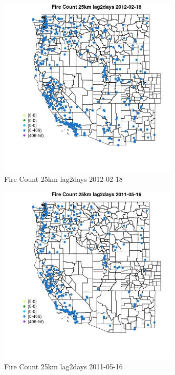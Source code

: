 \begin{figure} 
\centering  
\includegraphics[width=0.77\textwidth]{Code_Outputs/Report_ML_input_PM25_Step4_part_f_de_duplicated_aves_prioritize_24hr_obswNAs_MapObsFire_Count_25km_lag2days2012-02-18.jpg} 
\caption{\label{fig:Report_ML_input_PM25_Step4_part_f_de_duplicated_aves_prioritize_24hr_obswNAsMapObsFire_Count_25km_lag2days2012-02-18}Fire Count 25km lag2days 2012-02-18} 
\end{figure} 
 

\begin{figure} 
\centering  
\includegraphics[width=0.77\textwidth]{Code_Outputs/Report_ML_input_PM25_Step4_part_f_de_duplicated_aves_prioritize_24hr_obswNAs_MapObsFire_Count_25km_lag2days2011-05-16.jpg} 
\caption{\label{fig:Report_ML_input_PM25_Step4_part_f_de_duplicated_aves_prioritize_24hr_obswNAsMapObsFire_Count_25km_lag2days2011-05-16}Fire Count 25km lag2days 2011-05-16} 
\end{figure} 
 

